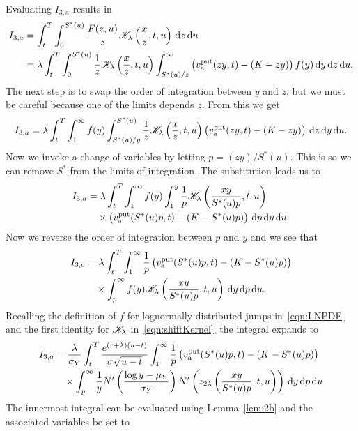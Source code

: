 	Evaluating $I_{3,a}$ results in
		\begin{align*}
			I_{3,a} &= \int_t^T \int_0^{S^*(u)} \frac{F(z,u)}{z}\mathscr K_\lambda\left( \frac{x}{z},t,u \right) \, \mathrm d z \, \mathrm d u \\
			&= \lambda  \int_t^T \int_0^{S^*(u)} \frac{1}{z}\mathscr K_\lambda\left( \frac{x}{z},t,u \right) \int_{S^*(u)/z}^\infty  \left( v_{\text{a}}^{\text{put}}(zy,t) - (K-zy) \right)f(y) \, \mathrm d y \, \mathrm d z \, \mathrm d u.
		\end{align*}
	The next step is to swap the order of integration between $y$ and $z$, but we must be careful because one of the limits depends $z$. From this we get
		$$
			I_{3,a} = \lambda  \int_t^T \int_1^\infty f(y) \int_{S^*(u)/y}^{S^*(u)} \frac{1}{z}\mathscr K_\lambda\left( \frac{x}{z},t,u \right)  \left( v_{\text{a}}^{\text{put}}(zy,t) - (K-zy) \right) \, \mathrm d z \, \mathrm d y \, \mathrm d u.
		$$
	Now we invoke a change of variables by letting $p = (zy)/S^*(u)$. This is so we can remove $S^*$ from the limits of integration. The substitution leads us to
		\begin{align*}
			I_{3,a} &=  \lambda  \int_t^T \int_1^\infty f(y) \int_1^y \frac{1}{p}\mathscr K_\lambda\left( \frac{xy}{S^*(u)p},t,u \right)  \\
			&\quad {} \times \left( v_{\text{a}}^{\text{put}}(S^*(u)p,t) - (K-S^*(u)p) \right) \, \mathrm d p \, \mathrm d y \, \mathrm d u.
		\end{align*}
	Now we reverse the order of integration between $p$ and $y$ and we see that
		\begin{align*}
			I_{3,a} &=  \lambda  \int_t^T \int_1^\infty \frac{1}{p} \left( v_{\text{a}}^{\text{put}}(S^*(u)p,t) - (K-S^*(u)p) \right)  \\
			&\quad {} \times \int_p^\infty f(y)\mathscr K_\lambda\left( \frac{xy}{S^*(u)p},t,u \right) \, \mathrm d y \, \mathrm d p \, \mathrm d u.
		\end{align*}
	Recalling the definition of $f$ for lognormally distributed jumps in~\eqref{eqn:LNPDF} and the first identity for $\mathscr K_\lambda$ in~\eqref{eqn:shiftKernel}, the integral expands to
		\begin{align*}
			I_{3,a} &=  \frac{\lambda}{\sigma_Y}  \int_t^T \frac{e^{(r+\lambda)(u-t)}}{\sigma\sqrt{u-t}} \int_1^\infty \frac{1}{p} \left( v_{\text{a}}^{\text{put}}(S^*(u)p,t) - (K-S^*(u)p) \right)  \\
			&\quad {} \times \int_p^\infty \frac{1}{y}N'\left( \frac{\log y - \mu_Y}{\sigma_Y} \right)N'\left( z_{2\lambda}\left( \frac{xy}{S^*(u)p}, t, u \right)\right) \, \mathrm d y \, \mathrm d p \, \mathrm d u 
		\end{align*}
		The innermost integral can be evaluated using Lemma~\ref{lem:2b} and the associated variables be set to
